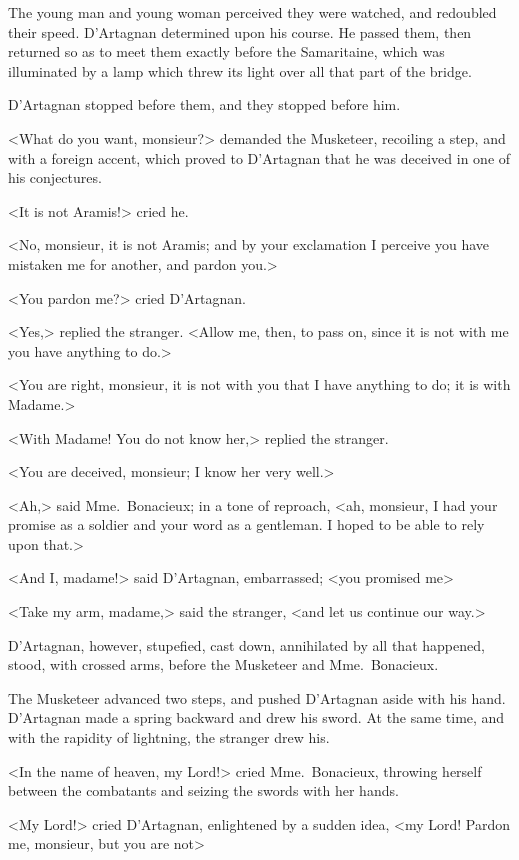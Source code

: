 The young man and young woman perceived they were watched, and redoubled their speed. D'Artagnan determined upon his course. He passed them, then returned so as to meet them exactly before the Samaritaine, which was illuminated by a lamp which threw its light over all that part of the bridge. 

D'Artagnan stopped before them, and they stopped before him. 

<What do you want, monsieur?> demanded the Musketeer, recoiling a step, and with a foreign accent, which proved to D'Artagnan that he was deceived in one of his conjectures. 

<It is not Aramis!> cried he. 

<No, monsieur, it is not Aramis; and by your exclamation I perceive you have mistaken me for another, and pardon you.> 

<You pardon me?> cried D'Artagnan. 

<Yes,> replied the stranger. <Allow me, then, to pass on, since it is not with me you have anything to do.> 

<You are right, monsieur, it is not with you that I have anything to do; it is with Madame.> 

<With Madame! You do not know her,> replied the stranger. 

<You are deceived, monsieur; I know her very well.> 

<Ah,> said Mme.~Bonacieux; in a tone of reproach, <ah, monsieur, I had your promise as a soldier and your word as a gentleman. I hoped to be able to rely upon that.> 

<And I, madame!> said D'Artagnan, embarrassed; <you promised me\longdash> 

<Take my arm, madame,> said the stranger, <and let us continue our way.> 

D'Artagnan, however, stupefied, cast down, annihilated by all that happened, stood, with crossed arms, before the Musketeer and Mme.~Bonacieux. 

The Musketeer advanced two steps, and pushed D'Artagnan aside with his hand. D'Artagnan made a spring backward and drew his sword. At the same time, and with the rapidity of lightning, the stranger drew his. 

<In the name of heaven, my Lord!> cried Mme.~Bonacieux, throwing herself between the combatants and seizing the swords with her hands. 

<My Lord!> cried D'Artagnan, enlightened by a sudden idea, <my Lord! Pardon me, monsieur, but you are not\longdash> 

